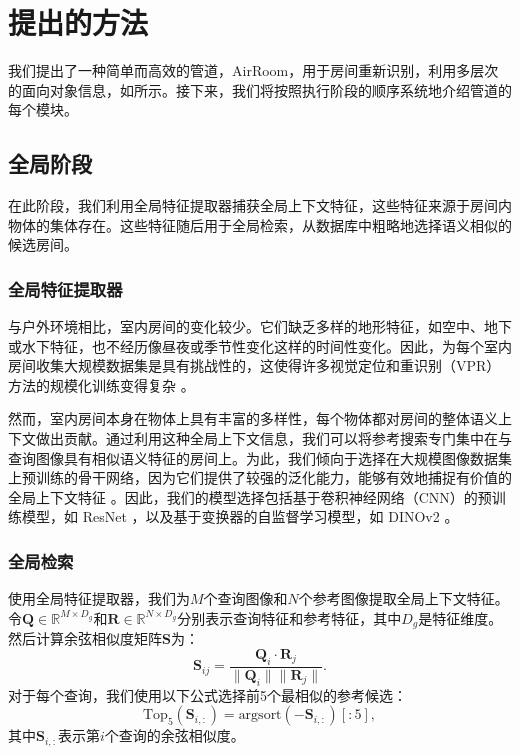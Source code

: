 \section{提出的方法}
\label{sec:proposed_approach}

我们提出了一种简单而高效的管道，AirRoom，用于房间重新识别，利用多层次的面向对象信息，如所示。接下来，我们将按照执行阶段的顺序系统地介绍管道的每个模块。
\subsection{全局阶段}

在此阶段，我们利用全局特征提取器捕获全局上下文特征，这些特征来源于房间内物体的集体存在。这些特征随后用于全局检索，从数据库中粗略地选择语义相似的候选房间。
\subsubsection{全局特征提取器}
\label{sec:section3.1.1}

与户外环境相比，室内房间的变化较少。它们缺乏多样的地形特征，如空中、地下或水下特征，也不经历像昼夜或季节性变化这样的时间性变化。因此，为每个室内房间收集大规模数据集是具有挑战性的，这使得许多视觉定位和重识别（VPR）方法的规模化训练变得复杂 \cite{arandjelović2016netvladcnnarchitectureweakly, hausler2021patchnetvladmultiscalefusionlocallyglobal, alibey2023mixvprfeaturemixingvisual}。

然而，室内房间本身在物体上具有丰富的多样性，每个物体都对房间的整体语义上下文做出贡献。通过利用这种全局上下文信息，我们可以将参考搜索专门集中在与查询图像具有相似语义特征的房间上。为此，我们倾向于选择在大规模图像数据集上预训练的骨干网络，因为它们提供了较强的泛化能力，能够有效地捕捉有价值的全局上下文特征 \cite{kornblith2019betterimagenetmodelstransfer}。因此，我们的模型选择包括基于卷积神经网络（CNN）的预训练模型，如 ResNet \cite{he2015deepresiduallearningimage}，以及基于变换器的自监督学习模型，如 DINOv2 \cite{oquab2024dinov2learningrobustvisual}。
\subsubsection{全局检索}

使用全局特征提取器，我们为\(M\)个查询图像和\(N\)个参考图像提取全局上下文特征。令\(\mathbf{Q} \in \mathbb{R}^{M \times D_g}\)和\(\mathbf{R} \in \mathbb{R}^{N \times D_g}\)分别表示查询特征和参考特征，其中\(D_g\)是特征维度。然后计算余弦相似度矩阵\(\mathbf{S}\)为：
\begin{equation}
    \mathbf{S}_{ij} = \frac{\mathbf{Q}_i \cdot \mathbf{R}_j}{\|\mathbf{Q}_i\| \|\mathbf{R}_j\|}.
    \label{eq:global feature cosine similarity}
\end{equation}
对于每个查询，我们使用以下公式选择前5个最相似的参考候选：
\begin{equation}
    \text{Top}_5(\mathbf{S}_{i, :}) = \text{argsort}(-\mathbf{S}_{i, :})[:5],
    \label{eq:global retrieval}
\end{equation}
其中\(\mathbf{S}_{i, :}\)表示第\(i\)个查询的余弦相似度。
